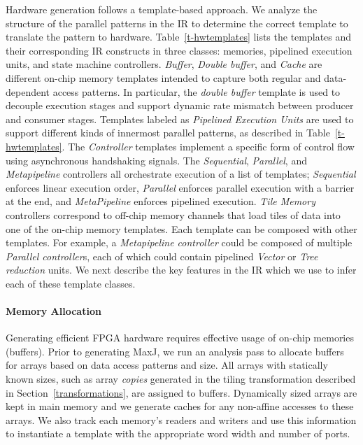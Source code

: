 Hardware generation follows a template-based approach. We analyze the structure of the parallel
patterns in the IR to determine the correct template to translate the pattern
to hardware. Table~\ref{t-hwtemplates} lists the templates and their corresponding IR constructs in three classes: memories, pipelined execution units,
and state machine controllers. \emph{Buffer}, \emph{Double buffer}, and \emph{Cache} are different on-chip memory
templates intended to capture both regular and data-dependent access patterns. In particular, the \emph{double buffer} template
is used to decouple execution stages and support dynamic rate mismatch between producer and consumer stages. Templates labeled as
\emph{Pipelined Execution Units} are used to support different kinds of innermost parallel patterns, as described in Table~\ref{t-hwtemplates}.
The \emph{Controller} templates implement a specific form of control flow using asynchronous handshaking signals. The \emph{Sequential},
\emph{Parallel}, and \emph{Metapipeline} controllers all orchestrate execution of a list of templates; \emph{Sequential} enforces
linear execution order, \emph{Parallel} enforces parallel execution with a barrier at the end, and \emph{MetaPipeline} enforces
pipelined execution. \emph{Tile Memory} controllers correspond to off-chip memory channels that load tiles of data into
one of the on-chip memory templates.
Each template can be composed with other templates.
For example, a \emph{Metapipeline controller} could be composed of multiple \emph{Parallel controller}s, each of which could
contain pipelined \emph{Vector} or \emph{Tree reduction} units.
We next describe the key features in the IR which we use to infer each of these template classes.



\paragraph{Memory Allocation}
Generating efficient FPGA hardware requires effective usage of on-chip memories (buffers).
Prior to generating MaxJ, we run an analysis pass to allocate buffers for arrays based on data access patterns and size.
All arrays with statically known sizes, such as array \emph{copies} generated in the tiling transformation described in
Section~\ref{transformations}, are assigned to buffers. Dynamically sized arrays are kept in main memory and we generate
caches for any non-affine accesses to these arrays.
We also track each memory's readers and writers and use this information
to instantiate a template with the appropriate word width and number of ports.

